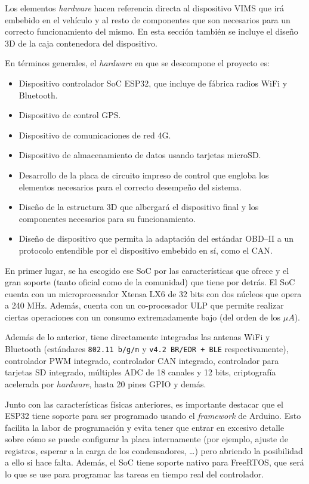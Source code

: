 Los elementos \textit{hardware} hacen referencia directa al dispositivo \ac{VIMS}
que irá embebido en el vehículo y al resto de componentes que son necesarios para
un correcto funcionamiento del mismo. En esta sección también se incluye el
diseño 3D de la caja contenedora del dispositivo.

En términos generales, el \textit{hardware} en que se descompone el proyecto es:

\begin{itemize}
  \item Dispositivo controlador \ac{SoC} ESP32, que incluye de fábrica radios WiFi y Bluetooth.
  \item Dispositivo de control \ac{GPS}.
  \item Dispositivo de comunicaciones de red 4G.
  \item Dispositivo de almacenamiento de datos usando tarjetas microSD.
  \item Desarrollo de la placa de circuito impreso de control que engloba los elementos
        necesarios para el correcto desempeño del sistema.
  \item Diseño de la estructura 3D que albergará el dispositivo final y los componentes
        necesarios para su funcionamiento.
  \item Diseño de dispositivo que permita la adaptación del estándar \ac{OBD}--II a
        un protocolo entendible por el dispositivo embebido en sí, como el \ac{CAN}.
\end{itemize}

En primer lugar, se ha escogido ese \ac{SoC} por las características que
ofrece y el gran soporte (tanto oficial como de la comunidad) que tiene por detrás.
El \ac{SoC} cuenta con un microprocesador Xtensa LX6 de 32 bits con dos
núcleos que opera a 240 MHz. Además, cuenta con un co-procesador \ac{ULP} que permite realizar
ciertas operaciones con un consumo extremadamente bajo (del orden de los $\mu A$).

Además de lo anterior, tiene directamente integradas las antenas WiFi y Bluetooth
(estándares \texttt{802.11 b/g/n} y \texttt{v4.2 \ac{BR/EDR} + \ac{BLE}} respectivamente),
controlador \ac{PWM} integrado, controlador \ac{CAN} integrado, controlador para
tarjetas SD integrado, múltiples \ac{ADC} de 18 canales y 12 bits,
criptografía acelerada por \textit{hardware}, hasta 20 pines \ac{GPIO} y demás.

Junto con las características físicas anteriores, es importante destacar que el
ESP32 tiene soporte para ser programado usando el \textit{framework} de Arduino.
Esto facilita la labor de programación y evita tener que entrar
en excesivo detalle sobre cómo se puede configurar la placa internamente
(por ejemplo, ajuste de registros, esperar a la carga de los condensadores, \dots)
pero abriendo la posibilidad a ello si hace falta. Además, el \ac{SoC} tiene
soporte nativo para FreeRTOS, que será lo que se use para programar las tareas
en tiempo real del controlador.


